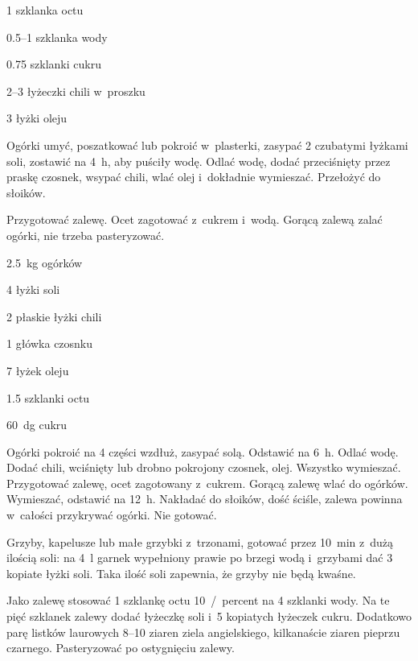 \documentclass[../main.tex]{subfiles}
\begin{document}
\begin{Ingred}[zalewa]
    \item \num{1} szklanka octu
    \item \numrange{0.5}{1} szklanka wody
    \item \num{0.75} szklanki cukru
    \item \numrange{2}{3} łyżeczki chili w~proszku
    \item \num{3} łyżki oleju
\end{Ingred}

Ogórki umyć, poszatkować lub pokroić w~plasterki, zasypać \num{2} czubatymi
łyżkami soli, zostawić na \qty{4}{\hour}, aby puściły wodę. Odlać wodę, dodać
przeciśnięty przez praskę czosnek, wsypać chili, wlać olej i~dokładnie
wymieszać. Przełożyć do słoików.

Przygotować zalewę. Ocet zagotować z~cukrem i~wodą. Gorącą zalewą zalać ogórki,
nie trzeba pasteryzować.


\begin{Ingred}
    \item \qty{2.5}{\kilo\gram} ogórków
    \item \num{4} łyżki soli
    \item \num{2} płaskie łyżki chili
    \item \num{1} główka czosnku
    \item \num{7} łyżek oleju
    \item \num{1.5} szklanki octu
    \item \qty{60}{\deka\gram} cukru
\end{Ingred}

Ogórki pokroić na \num{4} części wzdłuż, zasypać solą. Odstawić na
\qty{6}{\hour}. Odlać wodę. Dodać chili, wciśnięty lub drobno pokrojony
czosnek, olej. Wszystko wymieszać. Przygotować zalewę, ocet zagotowany
z~cukrem. Gorącą zalewę wlać do ogórków. Wymieszać, odstawić na
\qty{12}{\hour}. Nakładać do słoików, dość ściśle, zalewa powinna w~całości
przykrywać ogórki. Nie gotować.


Grzyby, kapelusze lub małe grzybki z~trzonami, gotować przez \qty{10}{\minute}
z~dużą ilością soli: na \qty{4}{\litre} garnek wypełniony prawie po brzegi wodą
i~grzybami dać \num{3} kopiate łyżki soli. Taka ilość soli zapewnia, że grzyby
nie będą kwaśne.

Jako zalewę stosować \num{1} szklankę octu \qty{10}{/percent} na \num{4}
szklanki wody. Na te pięć szklanek zalewy dodać łyżeczkę soli i~\num{5}
kopiatych łyżeczek cukru. Dodatkowo parę listków laurowych \numrange{8}{10}
ziaren ziela angielskiego, kilkanaście ziaren pieprzu czarnego. Pasteryzować po
ostygnięciu zalewy.
\end{document}
